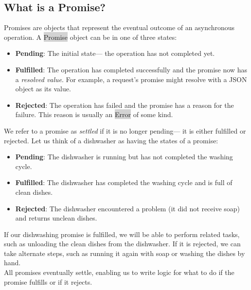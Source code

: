 \documentclass[11pt]{article}
\begin{document}
\subsection{What is a Promise?}
Promises are objects that represent the eventual outcome of an asynchronous operation. A \colorbox{lightgray}{Promise} object can be in one of three states:
\begin{itemize}[leftmargin = *]
\item \textbf{Pending}: The initial state— the operation has not completed yet.
\item \textbf{Fulfilled}: The operation has completed successfully and the promise now has a \textit{resolved value}. For example, a request’s promise might resolve with a JSON object as its value.
\item \textbf{Rejected}: The operation has failed and the promise has a reason for the failure. This reason is usually an \colorbox{lightgray}{Error} of some kind. 
\end{itemize}
We refer to a promise as \textit{settled} if it is no longer pending— it is either fulfilled or rejected. Let us think of a dishwasher as having the states of a promise:
\begin{itemize}[leftmargin = *]
\item \textbf{Pending}: The dishwasher is running but has not completed the washing cycle.
\item \textbf{Fulfilled}: The dishwasher has completed the washing cycle and is full of clean dishes.
\item \textbf{Rejected}: The dishwasher encountered a problem (it did not receive soap) and returns unclean dishes.
\end{itemize}
If our dishwashing promise is fulfilled, we will be able to perform related tasks, such as unloading the clean dishes from the dishwasher. If it is rejected, we can take alternate steps, such as running it again with soap or washing the dishes by hand. \\
\newline
All promises eventually settle, enabling us to write logic for what to do if the promise fulfills or if it rejects.
\end{document}
